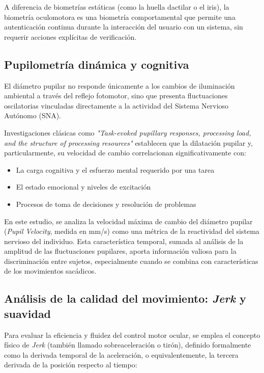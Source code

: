 A diferencia de biometrías estáticas (como la huella dactilar o el iris), la biometría oculomotora es una biometría comportamental que permite una autenticación continua durante la interacción del usuario con un sistema, sin requerir acciones explícitas de verificación.

\subsection{Pupilometría dinámica y cognitiva}

El diámetro pupilar no responde únicamente a los cambios de iluminación ambiental a través del reflejo fotomotor, sino que presenta fluctuaciones oscilatorias vinculadas directamente a la actividad del Sistema Nervioso Autónomo (SNA). 

Investigaciones clásicas como \textit{ "Task-evoked pupillary responses, processing load, and the structure of processing resources"} \cite{beatty1982} establecen que la dilatación pupilar y, particularmente, su velocidad de cambio correlacionan significativamente con:

\begin{itemize}
	\item La carga cognitiva y el esfuerzo mental requerido por una tarea
	\item El estado emocional y niveles de excitación
	\item Procesos de toma de decisiones y resolución de problemas
\end{itemize}

En este estudio, se analiza la velocidad máxima de cambio del diámetro pupilar (\textit{Pupil Velocity}, medida en mm/s) como una métrica de la reactividad del sistema nervioso del individuo. Esta característica temporal, sumada al análisis de la amplitud de las fluctuaciones pupilares, aporta información valiosa para la discriminación entre sujetos, especialmente cuando se combina con características de los movimientos sacádicos.

\subsection{Análisis de la calidad del movimiento: \textit{Jerk} y suavidad}

Para evaluar la eficiencia y fluidez del control motor ocular, se emplea el concepto físico de \textit{Jerk} (también llamado sobreaceleración o tirón), definido formalmente como la derivada temporal de la aceleración, o equivalentemente, la tercera derivada de la posición respecto al tiempo:

